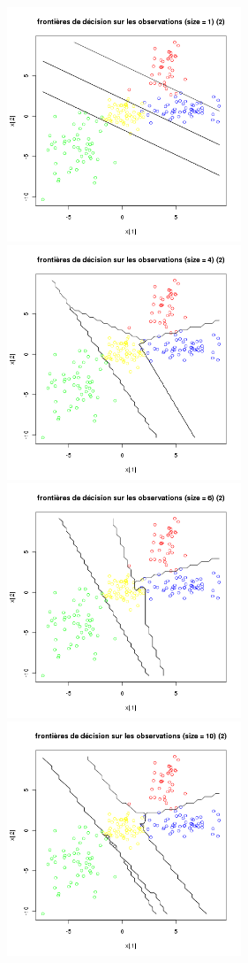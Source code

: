 \documentclass[a4paper, 10pt]{article}
\begin{document}
\includegraphics[height = 7cm, width = 7cm]{plots/frontiere_bayes_q3_3_1.png}
\includegraphics[height = 7cm, width = 7cm]{plots/frontiere_bayes_q3_3_4.png}\\
\includegraphics[height = 7cm, width = 7cm]{plots/frontiere_bayes_q3_3_6.png}
\includegraphics[height = 7cm, width = 7cm]{plots/frontiere_bayes_q3_3_10.png}\\
\end{document}

